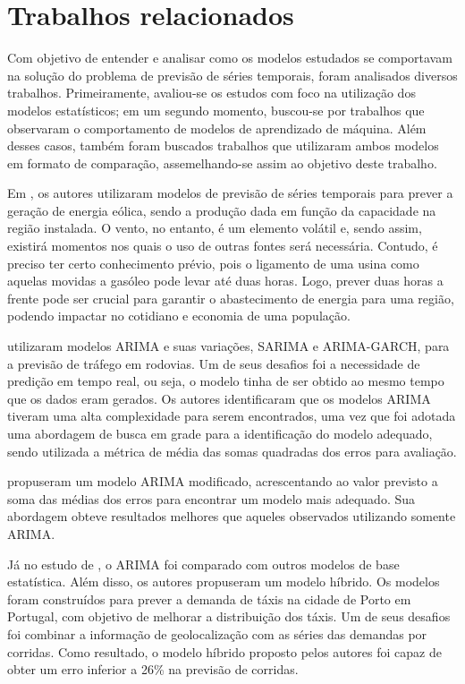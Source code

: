 \documentclass[
    12pt,
    oneside,
    a4paper,
    english,
    brazil
]{abntex2}
\begin{document}
\chapter{Trabalhos relacionados}\label{chap:trab_relacionados}

Com objetivo de entender e analisar como os modelos estudados se comportavam na
solução do problema de previsão  de séries temporais, foram analisados diversos
trabalhos.  Primeiramente, avaliou-se  os estudos  com foco  na utilização  dos
modelos  estatísticos;  em um  segundo  momento,  buscou-se por  trabalhos  que
observaram o  comportamento de modelos  de aprendizado de máquina.  Além desses
casos, também foram buscados trabalhos  que utilizaram ambos modelos em formato
de comparação, assemelhando-se assim ao objetivo deste trabalho.


Em ,  os autores utilizaram modelos  de previsão de
séries temporais para prever a geração de energia eólica, sendo a produção dada
em função da capacidade na região instalada. O vento, no entanto, é um elemento
volátil e, sendo assim, existirá momentos nos quais o uso de outras fontes será
necessária. Contudo, é preciso ter  certo conhecimento prévio, pois o ligamento
de uma usina  como aquelas movidas a  gasóleo pode levar até  duas horas. Logo,
prever duas  horas a frente pode  ser crucial para garantir  o abastecimento de
energia  para uma  região,  podendo impactar  no cotidiano  e  economia de  uma
população.

  utilizaram  modelos  ARIMA   e  suas  variações,  SARIMA  e
ARIMA-GARCH, para a previsão de tráfego em  rodovias. Um de seus desafios foi a
necessidade de predição em tempo real, ou seja, o modelo tinha de ser obtido ao
mesmo tempo que os dados eram  gerados. Os autores identificaram que os modelos
ARIMA tiveram  uma alta complexidade  para serem  encontrados, uma vez  que foi
adotada  uma  abordagem de  busca  em  grade  para  a identificação  do  modelo
adequado, sendo utilizada a métrica de média das somas quadradas dos erros para
avaliação.

 propuseram um modelo ARIMA modificado, acrescentando ao valor
previsto a  soma das médias dos  erros para encontrar um  modelo mais adequado.
Sua  abordagem obteve  resultados  melhores que  aqueles observados  utilizando
somente ARIMA\@.

Já no estudo  de , o ARIMA foi comparado  com outros modelos
de base  estatística. Além disso, os  autores propuseram um modelo  híbrido. Os
modelos foram construídos para prever a demanda  de táxis na cidade de Porto em
Portugal,  com objetivo  de  melhorar  a distribuição  dos  táxis.  Um de  seus
desafios foi combinar a informação de geolocalização com as séries das demandas
por corridas. Como resultado, o modelo híbrido proposto pelos autores foi capaz
de obter um erro inferior a 26\% na previsão de corridas.
\end{document}
